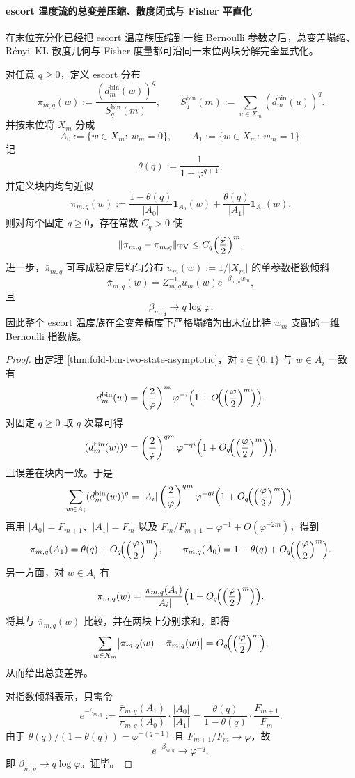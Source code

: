 \paragraph{escort 温度流的总变差压缩、散度闭式与 Fisher 平直化}
在末位充分化已经把 escort 温度族压缩到一维 Bernoulli 参数之后，总变差塌缩、Rényi--KL 散度几何与 Fisher 度量都可沿同一末位两块分解完全显式化。

\begin{theorem}\label{thm:xi-foldbin-escort-tv-collapse-onebit-gibbs}
对任意 \(q\ge 0\)，定义 escort 分布
\[
\pi_{m,q}(w):=\frac{(d_m^{\mathrm{bin}}(w))^q}{S_q^{\mathrm{bin}}(m)},
\qquad
S_q^{\mathrm{bin}}(m):=\sum_{u\in X_m}(d_m^{\mathrm{bin}}(u))^q.
\]
并按末位将 \(X_m\) 分成
\[
A_0:=\{w\in X_m:\ w_m=0\},
\qquad
A_1:=\{w\in X_m:\ w_m=1\}.
\]
记
\[
\theta(q):=\frac{1}{1+\varphi^{q+1}},
\]
并定义块内均匀近似
\[
\bar\pi_{m,q}(w):=
\frac{1-\theta(q)}{|A_0|}\mathbf 1_{A_0}(w)
+
\frac{\theta(q)}{|A_1|}\mathbf 1_{A_1}(w).
\]
则对每个固定 \(q\ge 0\)，存在常数 \(C_q>0\) 使
\[
\|\pi_{m,q}-\bar\pi_{m,q}\|_{\mathrm{TV}}
\le
C_q\Bigl(\frac{\varphi}{2}\Bigr)^m.
\]
进一步，\(\bar\pi_{m,q}\) 可写成稳定层均匀分布 \(u_m(w):=1/|X_m|\) 的单参数指数倾斜
\[
\bar\pi_{m,q}(w)=Z_{m,q}^{-1}u_m(w)e^{-\beta_{m,q}w_m},
\]
且
\[
\beta_{m,q}\longrightarrow q\log\varphi.
\]
因此整个 escort 温度族在全变差精度下严格塌缩为由末位比特 \(w_m\) 支配的一维 Bernoulli 指数族。
\end{theorem}
\begin{proof}
由定理 \ref{thm:fold-bin-two-state-asymptotic}，对 \(i\in\{0,1\}\) 与 \(w\in A_i\) 一致有
\[
d_m^{\mathrm{bin}}(w)
=
\left(\frac{2}{\varphi}\right)^m
\varphi^{-i}
\Bigl(1+O\!\Bigl(\Bigl(\frac{\varphi}{2}\Bigr)^m\Bigr)\Bigr).
\]
对固定 \(q\ge 0\) 取 \(q\) 次幂可得
\[
(d_m^{\mathrm{bin}}(w))^q
=
\left(\frac{2}{\varphi}\right)^{qm}
\varphi^{-qi}
\Bigl(1+O_q\!\Bigl(\Bigl(\frac{\varphi}{2}\Bigr)^m\Bigr)\Bigr),
\]
且误差在块内一致。于是
\[
\sum_{w\in A_i}(d_m^{\mathrm{bin}}(w))^q
=
|A_i|
\left(\frac{2}{\varphi}\right)^{qm}
\varphi^{-qi}
\Bigl(1+O_q\!\Bigl(\Bigl(\frac{\varphi}{2}\Bigr)^m\Bigr)\Bigr).
\]
再用 \(|A_0|=F_{m+1}\)、\(|A_1|=F_m\) 以及
\(
F_m/F_{m+1}=\varphi^{-1}+O(\varphi^{-2m})
\)，得到
\[
\pi_{m,q}(A_1)=\theta(q)+O_q\!\Bigl(\Bigl(\frac{\varphi}{2}\Bigr)^m\Bigr),
\qquad
\pi_{m,q}(A_0)=1-\theta(q)+O_q\!\Bigl(\Bigl(\frac{\varphi}{2}\Bigr)^m\Bigr).
\]
另一方面，对 \(w\in A_i\) 有
\[
\pi_{m,q}(w)
=
\frac{\pi_{m,q}(A_i)}{|A_i|}
\Bigl(1+O_q\!\Bigl(\Bigl(\frac{\varphi}{2}\Bigr)^m\Bigr)\Bigr).
\]
将其与 \(\bar\pi_{m,q}(w)\) 比较，并在两块上分别求和，即得
\[
\sum_{w\in X_m}\bigl|\pi_{m,q}(w)-\bar\pi_{m,q}(w)\bigr|
=
O_q\!\Bigl(\Bigl(\frac{\varphi}{2}\Bigr)^m\Bigr),
\]
从而给出总变差界。

对指数倾斜表示，只需令
\[
e^{-\beta_{m,q}}
:=
\frac{\bar\pi_{m,q}(A_1)}{\bar\pi_{m,q}(A_0)}
\cdot
\frac{|A_0|}{|A_1|}
=
\frac{\theta(q)}{1-\theta(q)}
\cdot
\frac{F_{m+1}}{F_m}.
\]
由于
\(
\theta(q)/(1-\theta(q))=\varphi^{-(q+1)}
\)
且 \(F_{m+1}/F_m\to\varphi\)，故
\[
e^{-\beta_{m,q}}\to \varphi^{-q},
\]
即 \(\beta_{m,q}\to q\log\varphi\)。证毕。
\end{proof}

